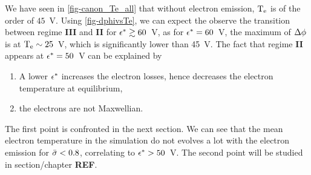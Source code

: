    
   We have seen in \vref{fig-canon_Te_all} that without electron emission, $\mathrm{T_e}$ is of the order of $45$~V.
   Using \cref{fig-dphivsTe}, we can expect the observe the transition between regime {\bf III} and {\bf II} for $\epsilon^{*} \gtrsim 60$~V, as for $\epsilon^{*} = 60$~V, the maximum of $\Delta \phi$ is at $\mathrm{T_e}\sim 25$~V, which is significantly lower than 45~V.
   The fact that regime {\bf II} appears at $\epsilon^{*}=50$~V can be explained by
   \begin{enumerate}
     \item A lower $\epsilon^{*}$ increases the electron losses, hence decreases the electron temperature at equilibrium,
     \item the electrons are not Maxwellian.
   \end{enumerate}
   The first point is confronted in the next section. 
   We can see that the mean electron temperature in the simulation do not evolves a lot with the electron emission for $ \bar{\sigma }  < 0.8$, correlating to  $\epsilon^{*} > 50$~V.  
   The second point will be studied in section/chapter {\bf REF}.
   
   
  